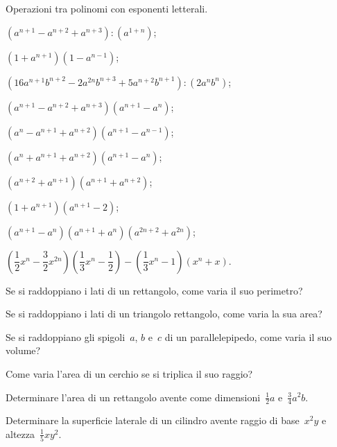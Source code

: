 \begin{esercizio}[\Ast]
 Operazioni tra polinomi con esponenti letterali.

\begin{enumeratea}
\item $\left(a^{n+1}-a^{n+2}+a^{n+3}\right):\left(a^{1+n}\right)$;
\item $\left(1+a^{n+1}\right)\left(1-a^{n-1}\right)$;
\item $\left(16a^{n+1}b^{n+2}-2a^{2n}b^{n+3}+5a^{n+2}b^{n+1}\right):\left(2a^{n}b^{n}\right)$;
\item $\left(a^{n+1}-a^{n+2}+a^{n+3}\right)\left(a^{n+1}-a^{n}\right)$;
\item $\left(a^{n}-a^{n+1}+a^{n+2}\right)\left(a^{n+1}-a^{n-1}\right)$;
\item $\left(a^{n}+a^{n+1}+a^{n+2}\right)\left(a^{n+1}-a^{n}\right)$;
\item $\left(a^{n+2}+a^{n+1}\right)\left(a^{n+1}+a^{n+2}\right)$;
\item $\left(1+a^{n+1}\right)\left(a^{n+1}-2\right)$;
\item $\left(a^{n+1}-a^{n}\right)\left(a^{n+1}+a^{n}\right)\left(a^{2n+2}+a^{2n}\right)$;
\item $\left(\dfrac{1}{2}x^{n}-\dfrac{3}{2}x^{2n}\right)\left(\dfrac{1}{3}x^{n}-\dfrac{1}{2}\right)-\left(\dfrac{1}{3}x^{n}-1\right)\left(x^{n}+x\right)$.
\end{enumeratea}
\end{esercizio}
\begin{multicols}{2}
\begin{esercizio}
 Se si raddoppiano i lati di un rettangolo, come varia il suo
perimetro?
\end{esercizio}

\begin{esercizio}
 Se si raddoppiano i lati di un triangolo rettangolo, come varia la sua
area?
\end{esercizio}

\begin{esercizio}
 Se si raddoppiano gli spigoli~$a$, $b$ e~$c$ di un parallelepipedo, come
varia il suo volume?
\end{esercizio}

\begin{esercizio}
 Come varia l'area di un cerchio se si triplica il suo
raggio?
\end{esercizio}

\begin{esercizio}
 Determinare l'area di un rettangolo avente come
dimensioni~$\frac{1}{2}a$ e~$\frac{3}{4}a^{2}b$.
\end{esercizio}

\begin{esercizio}
 Determinare la superficie laterale di un cilindro avente raggio di
base~$x^{2}y$ e altezza~$\frac{1}{5}{xy}^{2}$.
\end{esercizio}
\end{multicols}

